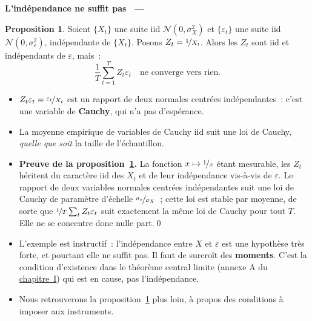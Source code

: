 \documentclass[10pt,a4paper]{article}
\makeatletter
\newcommand{\siteurl}{https://le-mans.adjemian.eu/econometrics}
\newcommand{\chapref}[2]{\href{\siteurl/chapitre-#1.pdf}{chapitre~#2}}
\newcommand{\normal}[2]{\mathcal N\left(#1,#2\right)}
\newcommand{\epsvar}{\sigma_{\varepsilon}^2}
\theoremstyle{definition}
\newtheorem{prop}{Proposition}
\renewcommand{\newline}{\unskip\par\vspace{1.5pt}}
\newenvironment{frame}[1][]{\par}{\par}
\newcommand{\frameheadrule}{%
  \par\nobreak\vspace{1pt}{\color{ctitle}\hrule height 0.6pt}\nobreak\vspace{4pt}}
\newcommand{\frametitle}[1]{%
  \par\addvspace{8pt plus 2pt}\needspace{6\baselineskip}%
  \noindent\begingroup\color{ctitle}\sffamily\bfseries\large #1\endgroup
  \@ifnextchar\framesubtitle{}{\frameheadrule}}
\newcommand{\framesubtitle}[1]{%
  \begingroup\color{ctitle}\sffamily\normalsize\ --- #1\endgroup\frameheadrule}
\makeatother
\begin{document}
\begin{frame}
  \frametitle{L'indépendance ne suffit pas}

  \begin{prop}\label{prop:cauchy}
    Soient $\{X_t\}$ une suite iid $\normal{0}{\sigma_X^2}$ et $\{\varepsilon_t\}$
    une suite iid $\normal{0}{\epsvar}$, indépendante de $\{X_t\}$. Posons
    $Z_t = \nicefrac{1}{X_t}$. Alors les $Z_t$ sont iid et indépendants
    de $\varepsilon$, mais~:
    \[
      \frac{1}{T}\sum_{t=1}^{T} Z_t\varepsilon_t \quad\text{ne converge vers rien.}
    \]
  \end{prop}

  \bigskip

  \begin{itemize}

  \item $Z_t\varepsilon_t = \nicefrac{\varepsilon_t}{X_t}$ est un rapport de deux
    normales centrées indépendantes~: c'est une variable de \textbf{Cauchy},
    qui n'a pas d'espérance.\newline

  \item[\dbend] La moyenne empirique de variables de Cauchy iid suit une loi de
    Cauchy, \emph{quelle que soit} la taille de l'échantillon.

  \end{itemize}

\end{frame}


\begin{notes}

  \begin{itemize}

  \item \textbf{Preuve de la proposition~\ref{prop:cauchy}.} La fonction
    $x\mapsto \nicefrac{1}{x}$ étant mesurable, les $Z_t$ héritent du caractère
    iid des $X_t$ et de leur indépendance vis-à-vis de $\varepsilon$. Le rapport
    de deux variables normales centrées indépendantes suit une loi de Cauchy de
    paramètre d'échelle $\nicefrac{\sigma_{\varepsilon}}{\sigma_X}$~; cette loi
    est stable par moyenne, de sorte que
    $\nicefrac{1}{T}\sum_t Z_t\varepsilon_t$ suit exactement la même loi de
    Cauchy pour tout $T$. Elle ne se concentre donc nulle part.\qed\newline

  \item L'exemple est instructif~: l'indépendance entre $X$ et $\varepsilon$ est
    une hypothèse très forte, et pourtant elle ne suffit pas. Il faut de surcroît
    des \textbf{moments}. C'est la condition d'existence dans le théorème central
    limite (annexe A du \chapref{1}{I}) qui est en
    cause, pas l'indépendance.\newline

  \item Nous retrouverons la proposition~\ref{prop:cauchy} plus loin, à propos
    des conditions à imposer aux instruments.

  \end{itemize}

\end{notes}
\end{document}
